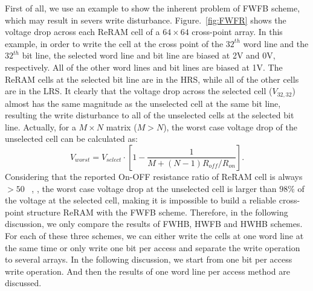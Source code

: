 First of all, we use an example to show the inherent problem of FWFB scheme, which may result in severs write disturbance.
Figure.~\ref{fig:FWFR} shows the voltage drop across each ReRAM cell of a $64 \times 64$ cross-point array. In this example, in order to write the cell at the cross point of the $32^{th}$ word line and the $32^{th}$ bit line, the selected word line and bit line are biased at 2V and 0V, respectively. All of the other word lines and bit lines are biased at 1V. The ReRAM cells at the selected bit line are in the HRS, while all of the other cells are in the LRS. It clearly that the voltage drop across the selected cell ($V_{32,32}$) almost has the same magnitude as the unselected cell at the same bit line, resulting the write disturbance to all of the unselected cells at the selected bit line. Actually, for a $M \times N$ matrix ($M>N$), the worst case voltage drop of the unselected cell can be calculated as:
\begin{equation}\label{worst_FWFB}
V_{worst}=V_{select} \cdot [1-\frac{1}{M+(N-1)R_{off}/R_{on}}].
\end{equation}
Considering that the reported On-OFF resistance ratio of
ReRAM cell is always $>50$ ~\cite{ReRAM_IEDM2010_Ho,ReRAM_IEDM2010_Chien,ReRAM_IEDM2010_Lee_Diode,ReRAM_IEDM2010_Lee_Evidence,ReRAM_ISSCC2011_Sheu,ReRAM_ISSCC2011_Otsuka},
, the worst case voltage drop at the unselected cell is larger than $98\%$ of the voltage at the selected cell, making it is impossible to build a reliable cross-point structure ReRAM with the FWFB scheme. Therefore, in the following discussion, we only compare the results of FWHB, HWFB and HWHB schemes. For each of these three schemes, we can either write the cells at one word line at the same time or only write one bit per access and separate the write operation to several arrays. In the
following discussion, we start from one bit per access write operation.
And then the results of one word line per access method are discussed.


 

